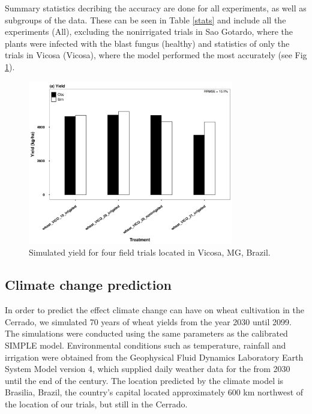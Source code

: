 \documentclass[11pt]{article}
\begin{document}
Summary statistics decribing the accuracy are done for all experiments, as well as subgroups of the data. These can be seen in Table \ref{stats} and include all the experiments (All), excluding the nonirrigated trials in Sao Gotardo, where the plants were infected with the blast fungus (healthy) and statistics of only the trials in Vicosa (Vicosa), where the model performed the most accurately (see Fig \ref{Vicosa}).

\begin{figure}[htbp]
\centering
\includegraphics[width=0.8\textwidth]{../results/experimental-data/2023-02-18_Vico_only.png}
\caption{\label{Vicosa}Simulated yield for four field trials located in Vicosa, MG, Brazil.}
\end{figure}


\subsection{Climate change prediction}
\label{sec:orgd142766}
In order to predict the effect climate change can have on wheat cultivation in the Cerrado, we simulated 70 years of wheat yields from the year 2030 until 2099. The simulations were conducted using the same parameters as the calibrated SIMPLE model. Environmental conditions such as temperature, rainfall and irrigation were obtained from the Geophysical Fluid Dynamics Laboratory Earth System Model version 4, which supplied daily weather data for the from 2030 until the end of the century. The location predicted by the climate model is Brasilia, Brazil, the country's capital located approximately 600 km northwest of the location of our trials, but still in the Cerrado.
\end{document}
